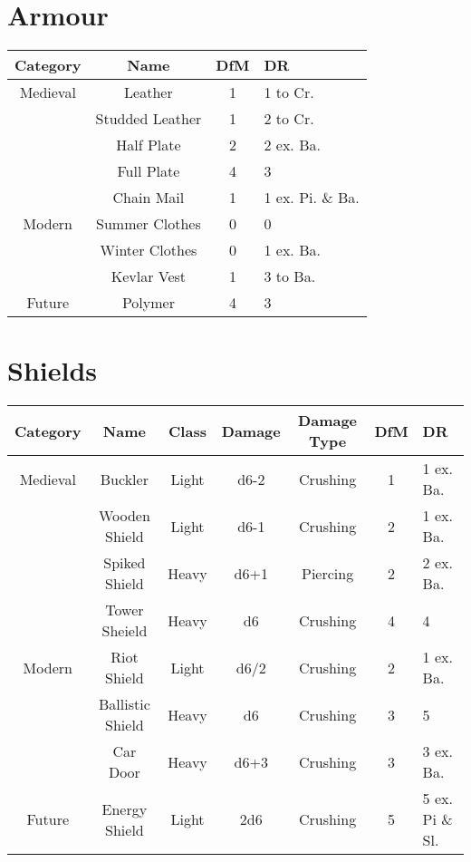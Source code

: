 \section{Armour} \label{sec:armour}
\begin{center}
\begin{tabular}{c|c|c|l}
\textbf{Category} & \textbf{Name}  & \textbf{DfM} & \textbf{DR}\\\hline
         Medieval & Leather        & 1 & 1 to Cr.\\
                  & Studded Leather& 1 & 2 to Cr.\\
                  & Half Plate     & 2 & 2 ex. Ba.\\
                  & Full Plate     & 4 & 3 \\
                  & Chain Mail     & 1 & 1 ex. Pi. \& Ba.\\\hline
           Modern & Summer Clothes & 0 & 0 \\
                  & Winter Clothes & 0 & 1 ex. Ba.\\
                  & Kevlar Vest    & 1 & 3 to Ba.\\\hline
           Future & Polymer        & 4 & 3 \\
\end{tabular}
\end{center}

\section{Shields} \label{sec:shields}
\begin{center}
    \begin{tabular}{c|c|c|c|c|c|l}
        \textbf{Category} & \textbf{Name} & \textbf{Class} & \textbf{Damage} & \textbf{Damage Type} & \textbf{DfM} & \textbf{DR} \\\hline
        Medieval & Buckler          & Light & d6-2 & Crushing & 1 & 1 ex. Ba.\\
                 & Wooden Shield    & Light & d6-1 & Crushing & 2 & 1 ex. Ba.\\
                 & Spiked Shield    & Heavy & d6+1 & Piercing & 2 & 2 ex. Ba.\\
                 & Tower Sheield    & Heavy & d6   & Crushing & 4 & 4\\\hline
        Modern   & Riot Shield      & Light & d6/2 & Crushing & 2 & 1 ex. Ba.\\
                 & Ballistic Shield & Heavy & d6   & Crushing & 3 & 5\\
                 & Car Door         & Heavy & d6+3 & Crushing & 3 & 3 ex. Ba.\\\hline
        Future   & Energy Shield    & Light & 2d6  & Crushing & 5 & 5 ex. Pi \& Sl.
    \end{tabular}
\end{center}


